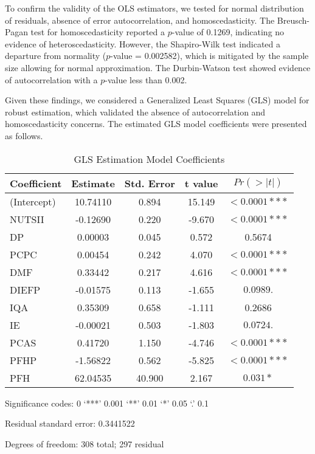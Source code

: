 \documentclass{aip-cp}
\begin{document}
To confirm the validity of the OLS estimators, we tested for normal distribution of residuals, absence of error autocorrelation, and homoscedasticity. The Breusch-Pagan test for homoscedasticity reported a \( p \)-value of 0.1269, indicating no evidence of heteroscedasticity. However, the Shapiro-Wilk test indicated a departure from normality (\( p \)-value = 0.002582), which is mitigated by the sample size allowing for normal approximation. The Durbin-Watson test showed evidence of autocorrelation with a \( p \)-value less than 0.002.

Given these findings, we considered a Generalized Least Squares (GLS) model for robust estimation, which validated the absence of autocorrelation and homoscedasticity concerns. The estimated GLS model coefficients were presented as follows.

\begin{table}[!ht]
\centering
\begin{threeparttable}
\begin{tabular}{lcccc}
\hline
\textbf{Coefficient} & \textbf{Estimate} & \textbf{Std. Error} & \textbf{t value} & \textbf{$Pr(>|t|)$} \\
\hline
(Intercept) & 10.74110 & 0.894 & 15.149 & $< 0.0001 ***$ \\
NUTSII & -0.12690 & 0.220 & -9.670 & $< 0.0001 ***$ \\
DP & 0.00003 & 0.045 & 0.572 & 0.5674 \\
PCPC & 0.00454 & 0.242 & 4.070 & $< 0.0001 ***$ \\
DMF & 0.33442 & 0.217 & 4.616 & $< 0.0001 ***$ \\
DIEFP & -0.01575 & 0.113 & -1.655 & $0.0989 .$ \\
IQA & 0.35309 & 0.658 & -1.111 & 0.2686 \\
IE & -0.00021 & 0.503 & -1.803 & $0.0724 .$ \\
PCAS & 0.41720 & 1.150 & -4.746 & $< 0.0001 ***$ \\
PFHP & -1.56822 & 0.562 & -5.825 & $< 0.0001 ***$ \\
PFH & 62.04535 & 40.900 & 2.167 & $0.031 *$ \\
\hline
\end{tabular}
\caption{GLS Estimation Model Coefficients}
\label{tab:gls_model}
\begin{tablenotes}
\small
\item Significance codes: 0 ‘***’ 0.001 ‘**’ 0.01 ‘*’ 0.05 ‘.’ 0.1
\item Residual standard error: 0.3441522
\item Degrees of freedom: 308 total; 297 residual
\end{tablenotes}
\end{threeparttable}
\end{table}
\end{document}
